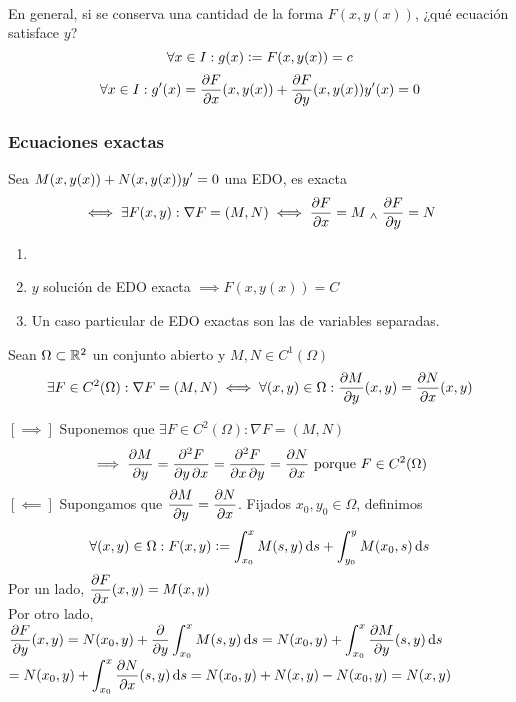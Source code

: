 \\
En general, si se conserva una cantidad de la forma $F(x, y(x))$, ¿qué ecuación satisface $y$?
\[\forall x \in I : g(x)\vcentcolon= F(x, y(x))= c\]
\[\forall x \in I : g'(x)=\pdv{F}{x}(x,y(x)) + \pdv{F}{y}(x, y(x))y'(x)=0\] %
\subsubsection{Ecuaciones exactas}
\begin{defn}
    Sea $\displaystyle M(x, y(x))+N(x, y(x))y'=0$ una EDO, es exacta
    \[\iff \exists F(x, y) : \nabla F=(M, N) \iff \pdv{F}{x}=M \; _{\wedge} \; \pdv{F}{y}=N\] 
\end{defn}
\begin{obs}
    \begin{enumerate}[topsep=0pt, itemsep=1pt,parsep=3pt]
        \item[] 
        \item $y$ solución de EDO exacta $\implies F(x, y(x))=C$
        \item Un caso particular de EDO exactas son las de variables separadas.
    \end{enumerate}
\end{obs}

\begin{prop}
    Sean $\Omega\subset \mathbb{R}^2$ un conjunto abierto y $M, N \in C^1(\Omega)$
    \[\exists F \in C^2(\Omega) : \nabla F=(M,N) \iff \forall (x,y) \in \Omega :\pdv{M}{y}(x,y)=\pdv{N}{x}(x,y)\]
    \begin{dem}
        $[\implies]$ Suponemos que $\exists F \in C^2(\Omega):\nabla F = (M, N)$
        \[\implies \pdv{M}{y}=\pdv{F}{y, x}=\pdv{F}{x, y}=\pdv{N}{x} \text{ porque } F \in C^2(\Omega) \]
        $[\impliedby]$ Supongamos que $\displaystyle\pdv{M}{y}=\pdv{N}{x}$. Fijados $x_0, y_0 \in \Omega$, definimos
        \[\forall (x, y) \in \Omega : F(x, y)\defeq \int_{x_0}^xM(s,y)\odif{s}+\int_{y_0}^yM(x_0,s)\odif{s}\]
        Por un lado, $\displaystyle \pdv{F}{x}(x,y)=M(x,y)$ \\
        Por otro lado, $\ds \pdv{F}{y}(x, y)=N(x_0, y) + \pdv{}{y} \int_{x_0}^x M(s,y) \odif{s} = N(x_0, y)+\int_{x_0}^x \pdv{M}{y}(s,y)\odif{s}$
        $\ds= N(x_0, y)+\int_{x_0}^x \pdv{N}{x}(s,y)\odif{s}=N(x_0, y)+N(x,y)-N(x_0, y)=N(x,y)$
    \end{dem}
\end{prop}

